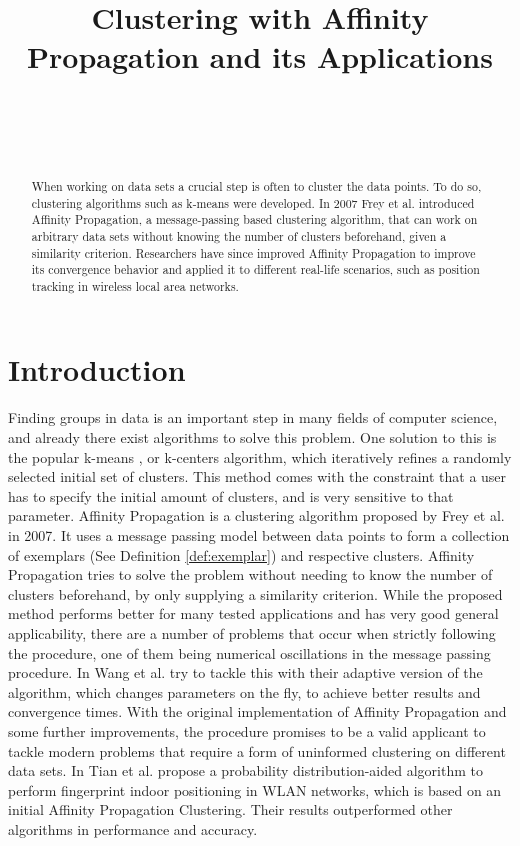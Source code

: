 \documentclass[11pt,a4paper]{article}
\title{Clustering with Affinity Propagation and its Applications}
\author{
 \authorname{Philipp-Alexander Auer} \\
 \studentnumber{01420446} \\
 \curriculum{033 535} \\
\email{e1420446@student.tuwien.ac.at}
}
\begin{document}
\maketitle

\begin{abstract}
	When working on data sets a crucial step is often to cluster the data points. To do so, clustering algorithms such as k-means were developed. In 2007 Frey et al. introduced Affinity Propagation, a message-passing based clustering algorithm, that can work on arbitrary data sets without knowing the number of clusters beforehand, given a similarity criterion. Researchers have since improved Affinity Propagation to improve its convergence behavior and applied it to different real-life scenarios, such as position tracking in wireless local area networks.
\end{abstract}

\section{Introduction}

Finding groups in data is an important step in many fields of computer science, and already there exist algorithms to solve this problem. One solution to this is the popular k-means \cite{hartigan1975clustering}, or k-centers algorithm, which iteratively refines a randomly selected initial set of clusters. This method comes with the constraint that a user has to specify the initial amount of clusters, and is very sensitive to that parameter.
Affinity Propagation \cite{frey2007clustering} is a clustering algorithm proposed by Frey et al. in 2007. It uses a message passing model between data points to form a collection of exemplars (See Definition \ref{def:exemplar}) and respective clusters. Affinity Propagation tries to solve the problem without needing to know the number of clusters beforehand, by only supplying a similarity criterion.
While the proposed method performs better for many tested applications and has very good general applicability, there are a number of problems that occur when strictly following the procedure, one of them being numerical oscillations in the message passing procedure. In \cite{wang2008adaptive} Wang et al. try to tackle this with their adaptive version of the algorithm, which changes parameters on the fly, to achieve better results and convergence times. With the original implementation of Affinity Propagation and some further improvements, the procedure promises to be a valid applicant to tackle modern problems that require a form of uninformed clustering on different data sets. In \cite{tian2013fingerprint} Tian et al. propose a probability distribution-aided algorithm to perform fingerprint indoor positioning in WLAN networks, which is based on an initial Affinity Propagation Clustering. Their results outperformed other algorithms in performance and accuracy.
\end{document}
